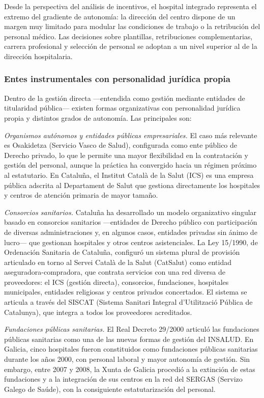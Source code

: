 Desde la perspectiva del análisis de incentivos, el hospital integrado representa el extremo del gradiente de autonomía: la dirección del centro dispone de un margen muy limitado para modular las condiciones de trabajo o la retribución del personal médico. Las decisiones sobre plantillas, retribuciones complementarias, carrera profesional y selección de personal se adoptan a un nivel superior al de la dirección hospitalaria.

\subsubsection{Entes instrumentales con personalidad jurídica propia}

Dentro de la gestión directa ---entendida como gestión mediante entidades de titularidad pública--- existen formas organizativas con personalidad jurídica propia y distintos grados de autonomía. Las principales son:

\textit{Organismos autónomos y entidades públicas empresariales.} El caso más relevante es Osakidetza (Servicio Vasco de Salud), configurada como ente público de Derecho privado, lo que le permite una mayor flexibilidad en la contratación y gestión del personal, aunque la práctica ha convergido hacia un régimen próximo al estatutario. En Cataluña, el Institut Català de la Salut (ICS) es una empresa pública adscrita al Departament de Salut que gestiona directamente los hospitales y centros de atención primaria de mayor tamaño.

\textit{Consorcios sanitarios.} Cataluña ha desarrollado un modelo organizativo singular basado en consorcios sanitarios ---entidades de Derecho público con participación de diversas administraciones y, en algunos casos, entidades privadas sin ánimo de lucro--- que gestionan hospitales y otros centros asistenciales. La Ley 15/1990, de Ordenación Sanitaria de Cataluña, configuró un sistema plural de provisión articulado en torno al Servei Català de la Salut (CatSalut) como entidad aseguradora-compradora, que contrata servicios con una red diversa de proveedores: el ICS (gestión directa), consorcios, fundaciones, hospitales municipales, entidades religiosas y centros privados concertados. El sistema se articula a través del SISCAT (Sistema Sanitari Integral d'Utilització Pública de Catalunya), que integra a todos los proveedores acreditados.

\textit{Fundaciones públicas sanitarias.} El Real Decreto 29/2000 articuló las fundaciones públicas sanitarias como una de las nuevas formas de gestión del INSALUD. En Galicia, cinco hospitales fueron constituidos como fundaciones públicas sanitarias durante los años 2000, con personal laboral y mayor autonomía de gestión. Sin embargo, entre 2007 y 2008, la Xunta de Galicia procedió a la extinción de estas fundaciones y a la integración de sus centros en la red del SERGAS (Servizo Galego de Saúde), con la consiguiente estatutarización del personal.

